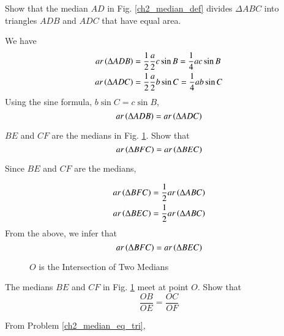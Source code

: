 \begin{problem}
	Show that the median $AD$ in Fig. \ref{ch2_median_def} divides  $\Delta ABC$ into triangles $ADB$ and $ADC$ that have equal area.
\end{problem}
\proof We have
%
\begin{align}
ar \left(\Delta ADB\right) &= \frac{1}{2}\frac{a}{2}c \sin B =  \frac{1}{4}ac \sin B \\
ar \left(\Delta ADC\right) &= \frac{1}{2}\frac{a}{2}b \sin C =  \frac{1}{4}ab \sin C 
\end{align}
%
Using the sine formula, $b \sin C = c \sin B$,
\begin{equation}
ar \left(\Delta ADB\right) = ar \left(\Delta ADC\right)
\end{equation}
\begin{problem}
	$BE$ and $CF$ are the medians in Fig. \ref{ch2_median_ratio}.  Show that
	\begin{equation}
	ar \left(\Delta BFC\right) = ar \left(\Delta BEC\right)
	\end{equation} 
	\label{ch2_median_eq_tri}
\end{problem}
\proof Since $BE$ and $CF$ are the medians, 

\begin{align}
ar \left(\Delta BFC\right) &= \frac{1}{2} ar \left(\Delta ABC\right) \\
ar \left(\Delta BEC\right) &= \frac{1}{2} ar \left(\Delta ABC\right) 
\end{align}
From the above, we infer that
%
\begin{equation}
ar \left(\Delta BFC\right) = ar \left(\Delta BEC\right)
\end{equation}


\begin{figure}[!h]
	\begin{center}
		
		\resizebox{\columnwidth}{!}{}
	\end{center}
	\caption{$O$ is the Intersection of Two Medians}
	\label{ch2_median_ratio}	
\end{figure}
%
\begin{problem}
	The medians $BE$ and $CF$ in Fig. \ref{ch2_median_ratio} meet at point $O$.  Show that
	\begin{equation}
	\frac{OB}{OE} = \frac{OC}{OF} 
	\end{equation} 
\end{problem}
\proof From Problem \ref{ch2_median_eq_tri},


